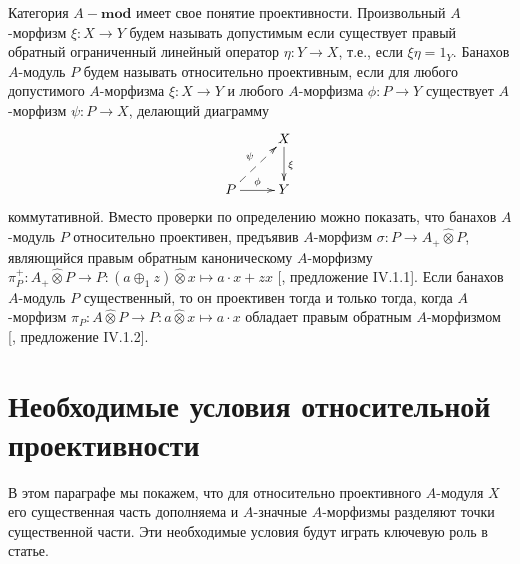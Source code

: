 \documentclass[12pt]{article}
\newcommand{\projtens}{\mathbin{\widehat{\otimes}}}
\begin{document}
Категория $A-\mathbf{mod}$ имеет свое понятие проективности. Произвольный
$A$-морфизм $\xi:X\to Y$ будем называть допустимым если существует правый
обратный ограниченный линейный оператор $\eta:Y\to X$, т.е., если $\xi\eta=1_Y$.
Банахов $A$-модуль $P$ будем называть относительно проективным, если для любого
допустимого $A$-морфизма $\xi:X\to Y$ и любого $A$-морфизма $\phi:P\to Y$
существует $A$-морфизм $\psi:P\to X$, делающий диаграмму
$$
    \xymatrix{
    & {X} \ar[d]^{\xi}\\  %
    {P} \ar@{-->}[ur]^{\psi} \ar[r]^{\phi} &{Y}}  %
$$
коммутативной. Вместо проверки по определению можно показать, что банахов
$A$-модуль $P$ относительно проективен, предъявив $A$-морфизм $\sigma:P\to
    A_+\projtens P$, являющийся правым обратным каноническому $A$-морфизму
$\pi_P^+:A_+\projtens P\to P:(a\oplus_1 z)\projtens x\mapsto a\cdot x+z x$
[\cite{HelHomolBanTopAlg}, предложение IV.1.1]. Если банахов $A$-модуль $P$
существенный, то он проективен тогда и только тогда, когда $A$-морфизм
$\pi_P:A\projtens P\to P: a\projtens x\mapsto a\cdot x$ обладает правым обратным
$A$-морфизмом [\cite{HelHomolBanTopAlg}, предложение IV.1.2].


\section{Необходимые условия относительной
  проективности}\label{NecessaryConditions}

В этом параграфе мы покажем, что для относительно проективного $A$-модуля $X$
его существенная часть дополняема и $A$-значные $A$-морфизмы разделяют точки
существенной части. Эти необходимые условия будут играть ключевую роль в статье.
\end{document}

